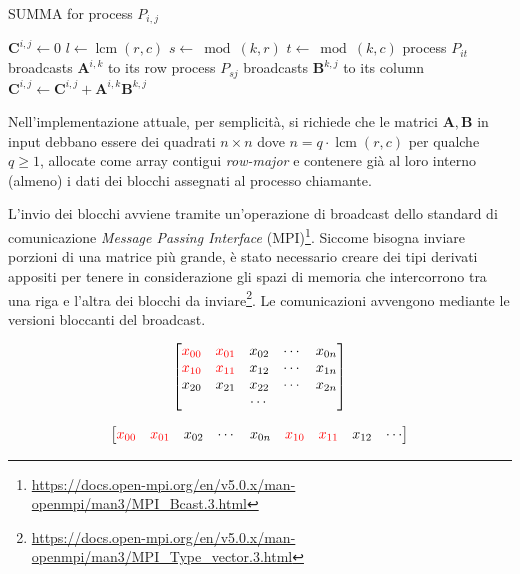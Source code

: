 \documentclass[a4paper]{article}
\DeclareMathOperator{\lcm}{lcm}
\begin{document}
\begin{algorithm}[ht]
    \caption{SUMMA for process $P_{i,j}$}
    \begin{algorithmic}
        \State $\mathbf{C}^{i,j} \gets 0$
        \State $l \gets \lcm(r,c)$
        \State $s \gets \bmod(k, r)$
        \State $t \gets \bmod(k, c)$
        \State process $P_{it}$ broadcasts $\mathbf{A}^{i,k}$ to its row
        \State process $P_{sj}$ broadcasts $\mathbf{B}^{k,j}$ to its column
        \State $\mathbf{C}^{i,j} \gets \mathbf{C}^{i,j} + \mathbf{A}^{i,k}\mathbf{B}^{k,j}$
        \EndFor
    \end{algorithmic}
\end{algorithm}

\medskip Nell'implementazione attuale, per semplicità, si richiede che le matrici $\mathbf{A}, \mathbf{B}$ in input debbano essere dei quadrati $n \times n$ dove $n = q \cdot \lcm(r,c)$ per qualche $q \ge 1$, allocate come array contigui \textit{row-major} e contenere già al loro interno (almeno) i dati dei blocchi assegnati al processo chiamante.

L'invio dei blocchi avviene tramite un'operazione di broadcast dello standard di comunicazione \textit{Message Passing Interface} (MPI)\footnote{\url{https://docs.open-mpi.org/en/v5.0.x/man-openmpi/man3/MPI_Bcast.3.html}}.
Siccome bisogna inviare porzioni di una matrice più grande, è stato necessario creare dei tipi derivati appositi per tenere in considerazione gli spazi di memoria che intercorrono tra una riga e l'altra dei blocchi da inviare\footnote{\url{https://docs.open-mpi.org/en/v5.0.x/man-openmpi/man3/MPI_Type_vector.3.html}}.
Le comunicazioni avvengono mediante le versioni bloccanti del broadcast. %

$$
    \begin{bmatrix}
        \color{red} x_{00} & \color{red} x_{01} & x_{02} & \cdots & x_{0n} \\
        \color{red} x_{10} & \color{red} x_{11} & x_{12} & \cdots & x_{1n} \\
        x_{20}             & x_{21}             & x_{22} & \cdots & x_{2n} \\
                           &                    & \cdots &        &        \\
    \end{bmatrix}
$$

$$
    \begin{bmatrix}
        \color{red} x_{00} & \color{red} x_{01} & x_{02} & \cdots & x_{0n} & \color{red} x_{10} & \color{red} x_{11} & x_{12} & \cdots
    \end{bmatrix}
$$
\end{document}
